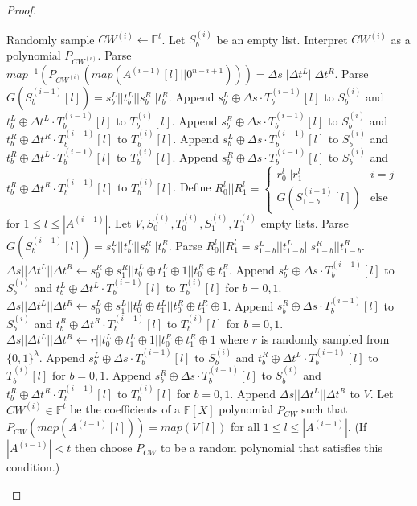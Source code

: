 \begin{proof}
\begin{algorithm}[H]
\begin{algorithmic}[1]
			\State Randomly sample $CW^{(i)}\leftarrow \mathbb{F}^t$.
			\State Let $S_b^{(i)}$ be an empty list. 
			\State Interpret $CW^{(i)}$ as a polynomial $P_{CW^{(i)}}$.
			\State Parse $map^{-1}(P_{CW^{(i)}}(map(A^{(i-1)}[l]||0^{n-i+1}))) = \Delta s||\Delta t^L||\Delta t^R$. 
			\State Parse $G(S_b^{(i-1)}[l]) = s_b^L||t_b^L||s_b^R||t_b^R$.
			\State Append $s_b^L\oplus \Delta s\cdot T_b^{(i-1)}[l]$ to $S_b^{(i)}$ and $t_b^L\oplus \Delta t^L\cdot T_b^{(i-1)}[l]$ to $T_b^{(i)}[l]$.
			\State Append $s_b^R\oplus \Delta s\cdot T_b^{(i-1)}[l]$ to $S_b^{(i)}$ and $t_b^R\oplus \Delta t^R\cdot T_b^{(i-1)}[l]$ to $T_b^{(i)}[l]$.
			\Else
			\State Append $s_b^L\oplus \Delta s\cdot T_b^{(i-1)}[l]$ to $S_b^{(i)}$ and $t_b^R\oplus \Delta t^L\cdot T_b^{(i-1)}[l]$ to $T_b^{(i)}[l]$.
			\State Append $s_b^R\oplus \Delta s\cdot T_b^{(i-1)}[l]$ to $S_b^{(i)}$ and $t_b^R\oplus \Delta t^R\cdot T_b^{(i-1)}[l]$ to $T_b^{(i)}[l]$.
			\EndIf
			\EndFor
			\Else
			\State Define $R_0^l||R_1^l = \begin{cases}r_0^l||r_1^l & i = j\\G(S_{1-b}^{(i-1)}[l]) & \text{else}\end{cases}$ for $1\le l\le |A^{(i-1)}|$.
			\State Let $V,S_0^{(i)},T_0^{(i)}, S_1^{(i)}, T_1^{(i)}$ empty lists. 
			\State Parse $G(S_b^{(i-1)}[l]) = s_b^L||t_b^L||s_b^R||t_b^R$.
			\State Parse $R_0^l||R_1^l = s_{1-b}^L||t_{1-b}^L||s_{1-b}^R||t_{1-b}^R$.
			\State $\Delta s||\Delta t^L||\Delta t^R\gets s_0^R\oplus s_1^R||t_0^L\oplus t_1^L\oplus 1||t_0^R\oplus t_1^R$. 
			\State Append $s_b^L\oplus \Delta s\cdot T_b^{(i-1)}[l]$ to $S_b^{(i)}$ and $t_b^L\oplus \Delta t^L\cdot T_b^{(i-1)}[l]$ to $T_b^{(i)}[l]$ for $b = 0,1$. 
			\State $\Delta s||\Delta t^L||\Delta t^R\gets s_0^L\oplus s_1^L||t_0^L\oplus t_1^L||t_0^R\oplus t_1^R\oplus 1$. 
			\State Append $s_b^R\oplus \Delta s\cdot T_b^{(i-1)}[l]$ to $S_b^{(i)}$ and $t_b^R\oplus \Delta t^R\cdot T_b^{(i-1)}[l]$ to $T_b^{(i)}[l]$ for $b = 0,1$. 
			\Else
			\State $\Delta s||\Delta t^L||\Delta t^R\gets r||t_0^L\oplus t_1^L\oplus 1||t_0^R\oplus t_1^R\oplus 1$ where $r$ is randomly sampled from $\{0,1\}^\lambda$.
			\State Append $s_b^L\oplus \Delta s\cdot T_b^{(i-1)}[l]$ to $S_b^{(i)}$ and $t_b^R\oplus \Delta t^L\cdot T_b^{(i-1)}[l]$ to $T_b^{(i)}[l]$ for $b = 0,1$. 
			\State Append $s_b^R\oplus \Delta s\cdot T_b^{(i-1)}[l]$ to $S_b^{(i)}$ and $t_b^R\oplus \Delta t^R\cdot T_b^{(i-1)}[l]$ to $T_b^{(i)}[l]$ for $b = 0,1$. 
			\EndIf
			\State Append $\Delta s||\Delta t^L||\Delta t^R$ to $V$. 
			\EndFor
			\State Let $CW^{(i)}\in \mathbb{F}^t$ be the coefficients of a $\mathbb{F}[X]$ polynomial $P_{CW}$ such that $P_{CW}(map(A^{(i-1)}[l])) = map(V[l])$ for all $1\le l\le |A^{(i-1)}|$. (If $|A^{(i-1)}|<t$ then choose $P_{CW}$ to be a random polynomial that satisfies this condition.)
			\EndIf
			\EndFor
			

\end{algorithmic}
\end{algorithm}
\end{proof}
